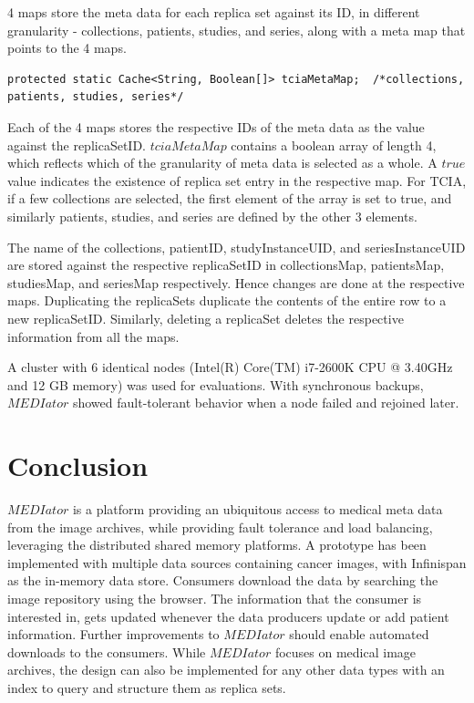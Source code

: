 \documentclass[conference]{IEEEtran}
\begin{document}
4 maps store the meta data for each replica set against its ID, in different granularity - collections, patients, studies, and series, along with a meta map that points to the 4 maps. 
 \vspace{-10pt}
\begin{lstlisting}  
protected static Cache<String, Boolean[]> tciaMetaMap;  /*collections, patients, studies, series*/
\end{lstlisting} 
\vspace{-9pt}
Each of the 4 maps stores the respective IDs of the meta data as the value against the replicaSetID. $tciaMetaMap$ contains a boolean array of length 4, which reflects which of the granularity of meta data is selected as a whole. A $true$ value indicates the existence of replica set entry in the respective map. For TCIA, if a few collections are selected, the first element of the array is set to true, and similarly patients, studies, and series are defined by the other 3 elements.

The name of the collections, patientID, studyInstanceUID, and seriesInstanceUID are stored against the respective replicaSetID in collectionsMap, patientsMap, studiesMap, and seriesMap respectively. Hence changes are done at the respective maps. Duplicating the replicaSets duplicate the contents of the entire row to a new replicaSetID. Similarly, deleting a replicaSet deletes the respective information from all the maps.

A cluster with 6 identical nodes (Intel(R) Core(TM) i7-2600K CPU @ 3.40GHz and 12 GB memory) was used for evaluations. With synchronous backups, $MEDIator$ showed fault-tolerant behavior when a node failed and rejoined later. 


\section{Conclusion}
\balance

$MEDIator$ is a platform providing an ubiquitous access to medical meta data from the image archives, while providing fault tolerance and load balancing, leveraging the distributed shared memory platforms. A prototype has been implemented with multiple data sources containing cancer images, with Infinispan as the in-memory data store. Consumers download the data by searching the image repository using the browser. The information that the consumer is interested in, gets updated whenever the data producers update or add patient information. Further improvements to $MEDIator$ should enable automated downloads to the consumers. While $MEDIator$ focuses on medical image archives, the design can also be implemented for any other data types with an index to query and structure them as replica sets.
\end{document}
